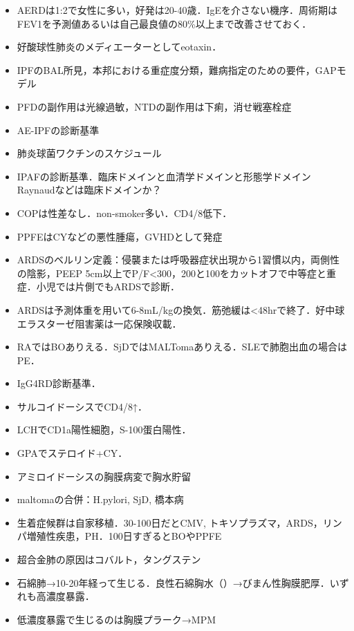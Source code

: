 \begin{itemize}
\item AERDは1:2で女性に多い，好発は20-40歳．IgEを介さない機序．周術期はFEV1を予測値あるいは自己最良値の80\%以上まで改善させておく．

\item 好酸球性肺炎のメディエーターとしてeotaxin．

\item IPFのBAL所見，本邦における重症度分類，難病指定のための要件，GAPモデル
\item PFDの副作用は光線過敏，NTDの副作用は下痢，消せ戦塞栓症

\item AE-IPFの診断基準
\item 肺炎球菌ワクチンのスケジュール

\item IPAFの診断基準．臨床ドメインと血清学ドメインと形態学ドメイン Raynaudなどは臨床ドメインか？
\item COPは性差なし．non-smoker多い．CD4/8低下．
\item PPFEはCYなどの悪性腫瘍，GVHDとして発症

\item ARDSのベルリン定義：侵襲または呼吸器症状出現から1習慣以内，両側性の陰影，PEEP 5cm以上でP/F<300，200と100をカットオフで中等症と重症．小児では片側でもARDSで診断．
\item ARDSは予測体重を用いて6-8mL/kgの換気．筋弛緩は<48hrで終了．好中球エラスターゼ阻害薬は一応保険収載．


\item RAではBOありえる．SjDではMALTomaありえる．SLEで肺胞出血の場合はPE．
\item IgG4RD診断基準．
\item サルコイドーシスでCD4/8↑．
\item LCHでCD1a陽性細胞，S-100蛋白陽性．
\item GPAでステロイド+CY．
\item アミロイドーシスの胸膜病変で胸水貯留
\item maltomaの合併：H.pylori, SjD, 橋本病

\item 生着症候群は自家移植．30-100日だとCMV, トキソプラズマ，ARDS，リンパ増殖性疾患，PH．100日すぎるとBOやPPFE

\item 超合金肺の原因はコバルト，タングステン
\item 石綿肺→10-20年経って生じる．良性石綿胸水（）→びまん性胸膜肥厚．いずれも高濃度暴露．
\item 低濃度暴露で生じるのは胸膜プラーク→MPM

\end{itemize}

